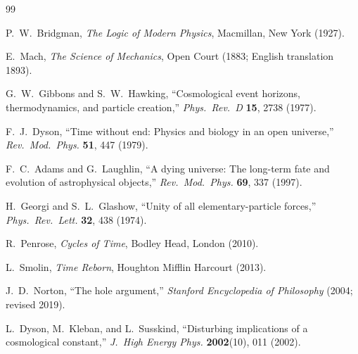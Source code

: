 \documentclass[11pt,a4paper]{article}
\begin{document}
\begin{thebibliography}{99}

P.~W.~Bridgman,
\textit{The Logic of Modern Physics},
Macmillan, New York (1927).

E.~Mach,
\textit{The Science of Mechanics},
Open Court (1883; English translation 1893).

G.~W.~Gibbons and S.~W.~Hawking,
``Cosmological event horizons, thermodynamics, and particle creation,''
\textit{Phys.\ Rev.\ D} \textbf{15}, 2738 (1977).

F.~J.~Dyson,
``Time without end: Physics and biology in an open universe,''
\textit{Rev.\ Mod.\ Phys.} \textbf{51}, 447 (1979).

F.~C.~Adams and G.~Laughlin,
``A dying universe: The long-term fate and evolution of astrophysical objects,''
\textit{Rev.\ Mod.\ Phys.} \textbf{69}, 337 (1997).

H.~Georgi and S.~L.~Glashow,
``Unity of all elementary-particle forces,''
\textit{Phys.\ Rev.\ Lett.} \textbf{32}, 438 (1974).

R.~Penrose,
\textit{Cycles of Time},
Bodley Head, London (2010).

L.~Smolin,
\textit{Time Reborn},
Houghton Mifflin Harcourt (2013).

J.~D.~Norton,
``The hole argument,''
\textit{Stanford Encyclopedia of Philosophy} (2004; revised 2019).

L.~Dyson, M.~Kleban, and L.~Susskind,
``Disturbing implications of a cosmological constant,''
\textit{J.\ High Energy Phys.} \textbf{2002}(10), 011 (2002).

\end{thebibliography}
\end{document}
